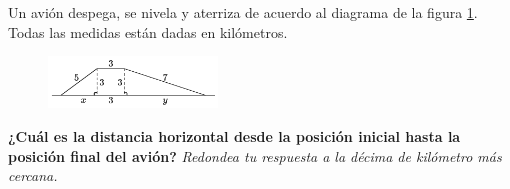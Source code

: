 Un avión despega, se nivela y aterriza de acuerdo al diagrama de la figura \ref{fig:des_pitagoras_07}.
Todas las medidas están dadas en kilómetros.

\begin{figure}[H]
    \begin{center}
        \includegraphics[width=0.4\textwidth]{../images/des_pitagoras_07.png}
    \end{center}
    \caption{}
    \label{fig:des_pitagoras_07}
\end{figure}

\textbf{¿Cuál es la distancia horizontal desde la posición inicial hasta la posición final del avión?}
\textit{Redondea tu respuesta a la décima de kilómetro más cercana.}
